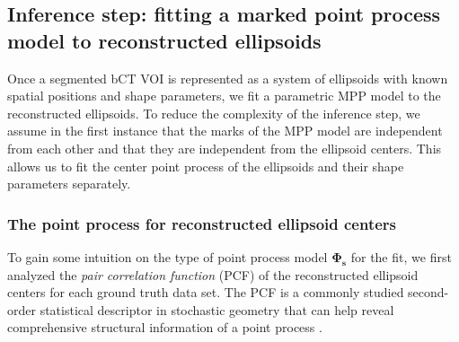 \documentclass[journal]{IEEEtran}
\begin{document}






\setcounter{table}{0}

\subsection{Inference step: fitting a marked point process model to
  reconstructed ellipsoids}
\label{sec:infer-step:-fitt}

Once a segmented bCT VOI is represented as a system of ellipsoids with
known spatial positions and shape parameters, we fit a parametric MPP
model to the reconstructed ellipsoids. To reduce the complexity of the
inference step, we assume in the first instance that the marks of the
MPP model are independent from each other and that they are
independent from the ellipsoid centers. This allows us to fit the
center point process of the ellipsoids and their shape parameters
separately.

\subsubsection{The point process for reconstructed ellipsoid centers}
\label{sec:point-proc-reconstr}

To gain some intuition on the type of point process model
$\mathbf{\Phi_s}$ for the fit, we first analyzed the \textit{pair
  correlation function} (PCF) of the reconstructed ellipsoid centers
for each ground truth data set. The PCF is a commonly studied
second-order statistical descriptor in stochastic geometry that can
help reveal comprehensive structural information of a point process
\cite{baddeley2007spatial}.
\end{document}
